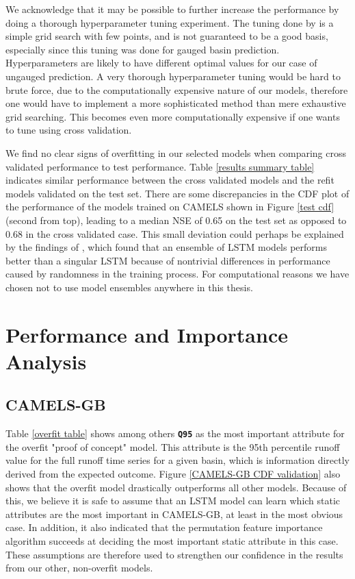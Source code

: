 We acknowledge that it may be possible to further increase the performance by doing 
a thorough hyperparameter tuning experiment. The tuning done by \citet{lstm_second_paper} 
is a simple grid search with few points, and is not guaranteed to be a good basis, 
especially since this tuning was done for gauged basin prediction. Hyperparameters 
are likely to have different optimal values for our case of ungauged prediction. A very thorough 
hyperparameter tuning would be hard to brute force, due to the computationally 
expensive nature of our models, therefore one would have to implement a more sophisticated 
method than mere exhaustive grid searching. This becomes even more computationally 
expensive if one wants to tune using cross validation.

We find no clear signs of overfitting in our selected models when comparing 
cross validated performance to test performance. Table 
\ref{results summary table} indicates 
similar performance between the cross validated models and the refit models 
validated on the test set. There are some discrepancies in the CDF plot of 
the performance of the models trained on CAMELS 
shown in Figure \ref{test cdf} (second from top), leading to a median NSE of 
0.65 on the test set as opposed to $0.68$ in the cross validated case. This small 
deviation could perhaps be explained by the findings of \citet{lstm_second_paper},
 which found that an ensemble of LSTM models performs better than a singular LSTM 
 because of nontrivial differences in performance caused by randomness in the 
 training process. For computational reasons we have chosen not to use model 
 ensembles anywhere in this thesis.

\section{Performance and Importance Analysis}
\label{discuss static attributes}
\subsection{CAMELS-GB}
Table \ref{overfit table} shows among others \textbf{\texttt{Q95}} as the most 
important attribute for the overfit "proof of concept" model. This attribute is the 
95th percentile runoff value for the full runoff time series for a given basin, 
which is information directly derived from the expected outcome. 
Figure \ref{CAMELS-GB CDF validation} also shows that the overfit model drastically 
outperforms all other models.
Because of this, we believe it is 
safe to assume that an LSTM model can learn which static attributes are 
the most important in CAMELS-GB, at least in the most obvious case. In addition, 
it also indicated that the permutation feature importance algorithm succeeds at deciding the most important 
static attribute in this case. These assumptions are therefore used to strengthen 
our confidence in the results from our other, non-overfit models. 

